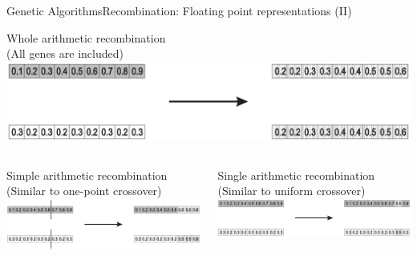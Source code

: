 \documentclass[10pt,compress]{beamer} %
\begin{document}
\begin{frame}{Genetic Algorithms}{Recombination: Floating point representations (II)}
	\vspace{-0.75cm}
	\begin{center}
	Whole arithmetic recombination\\
	\footnotesize{(All genes are included)}\\
	\includegraphics[width=0.5\linewidth]{figs/wholearithmetic.eps}\\
	\end{center}
	\vspace{-0.5cm}

    \begin{columns}
		\begin{center}
		Simple arithmetic recombination\\
		\footnotesize{(Similar to one-point crossover)}
		\includegraphics[width=\linewidth]{figs/simplearithmetic.eps}\\
		\end{center}
		\begin{center}
		Single arithmetic recombination\\
		\footnotesize{(Similar to uniform crossover)}
		\includegraphics[width=\linewidth]{figs/singlearithmetic.eps}\\
		\end{center}
		\end{columns}
\end{frame}
\end{document}

